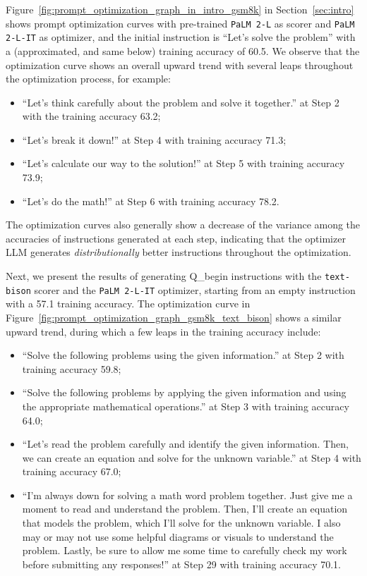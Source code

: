 Figure~\ref{fig:prompt_optimization_graph_in_intro_gsm8k} in Section~\ref{sec:intro} shows prompt optimization curves with pre-trained \texttt{PaLM 2-L} as scorer and \texttt{PaLM 2-L-IT} as optimizer, and the initial instruction is ``Let's solve the problem'' with a (approximated, and same below) training accuracy of 60.5.
We observe that the optimization curve shows an overall upward trend with several leaps throughout the optimization process, for example:
\begin{itemize}[leftmargin=2em,topsep=0pt,partopsep=1ex,parsep=0ex]
\item ``Let's think carefully about the problem and solve it together.'' at Step 2 with the training accuracy 63.2;
\item ``Let's break it down!'' at Step 4 with training accuracy 71.3;
\item ``Let's calculate our way to the solution!'' at Step 5 with training accuracy 73.9;
\item ``Let's do the math!'' at Step 6 with training accuracy 78.2.
\end{itemize}

The optimization curves also generally show a decrease of the variance among the accuracies of instructions generated at each step, indicating that the optimizer LLM generates \emph{distributionally} better instructions throughout the optimization.

Next, we present the results of generating Q\_begin instructions with the \texttt{text-bison} scorer and the \texttt{PaLM 2-L-IT} optimizer, starting from an empty instruction with a 57.1 training accuracy.
The optimization curve in Figure~\ref{fig:prompt_optimization_graph_gsm8k_text_bison} shows a similar upward trend, during which a few leaps in the training accuracy include:
\begin{itemize}[leftmargin=2em,topsep=0pt,partopsep=1ex,parsep=0ex]
\item ``Solve the following problems using the given information.'' at Step 2 with training accuracy 59.8;
\item ``Solve the following problems by applying the given information and using the appropriate mathematical operations.'' at Step 3 with training accuracy 64.0;
\item ``Let's read the problem carefully and identify the given information. Then, we can create an equation and solve for the unknown variable.'' at Step 4 with training accuracy 67.0;
\item ``I'm always down for solving a math word problem together. Just give me a moment to read and understand the problem. Then, I'll create an equation that models the problem, which I'll solve for the unknown variable. I also may or may not use some helpful diagrams or visuals to understand the problem. Lastly, be sure to allow me some time to carefully check my work before submitting any responses!'' at Step 29 with training accuracy 70.1.
\end{itemize}

